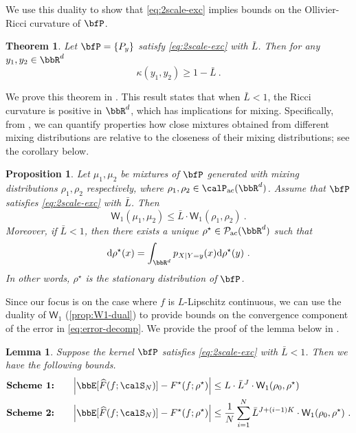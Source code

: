 \documentclass[11pt]{article}
\newtheorem{theorem}{Theorem}[section]
\newtheorem{lemma}{Lemma}[section]
\newtheorem{proposition}{Proposition}[section]
\newcounter{ct}
\newcommand{\rmd}{\mathrm{d}}
\begin{document}
We use this duality to show that \ref{eq:2scale-exc} implies bounds on the Ollivier-Ricci curvature of \(\bfP\).
\begin{theorem}
\label{thm:ricci-curvature}
Let \(\bfP = \{P_{y}\}\) satisfy \ref{eq:2scale-exc} with \(\bar{L}\).
Then for any \(y_{1}, y_{2} \in \bbR^{d}\)
\begin{equation*}
    \kappa(y_{1}, y_{2}) \geq 1 - \bar{L}~.
\end{equation*}
\end{theorem}
We prove this theorem in .
This result states that when \(\bar{L} < 1\), the Ricci curvature is positive in \(\bbR^{d}\), which has implications for mixing.
Specifically, from \citet[Prop. 20]{ollivier2009ricci}, we can quantify properties how close mixtures obtained from different mixing distributions are relative to the closeness of their mixing distributions; see the corollary below.
\begin{proposition}
\label{prop:w1-contract}
Let \(\mu_{1}, \mu_{2}\) be mixtures of \(\bfP\) generated with mixing distributions \(\rho_{1}, \rho_{2}\) respectively, where \(\rho_{1}, \rho_{2} \in \calP_{\mathrm{ac}}(\bbR^{d})\).
Assume that \(\bfP\) satisfies \ref{eq:2scale-exc} with \(\bar{L}\).
Then
\begin{equation*}
    \mathsf{W}_{1}(\mu_{1}, \mu_{2}) \leq \bar{L} \cdot \mathsf{W}_{1}(\rho_{1}, \rho_{2})~.
\end{equation*}
Moreover, if \(\bar{L} < 1\), then there exists a unique \(\rho^{\star} \in \mathcal{P}_{\mathrm{ac}}(\bbR^{d})\) such that
\begin{equation*}
    \rmd \rho^{\star}(x) = \int_{\bbR^{d}} p_{X | Y = y}(x)\rmd \rho^{\star}(y)~.
\end{equation*}
In other words, \(\rho^{\star}\) is the stationary distribution of \(\bfP\).
\end{proposition}

Since our focus is on the case where \(f\) is \(L\)-Lipschitz continuous, we can use the duality of \(\mathsf{W}_{1}\) (\cref{prop:W1-dual}) to provide bounds on the convergence component of the error in \cref{eq:error-decomp}.
We provide the proof of the lemma below in .

\begin{lemma}
\label{lem:conv-error-bound}
Suppose the kernel \(\bfP\) satisfies \ref{eq:2scale-exc} with \(\bar{L} < 1\).
Then we have the following bounds.
        \begin{align*}
            \textbf{Scheme 1:} & & \quad \left|\bbE[\widehat{F}(f; \calS_{N})] - F^{\star}(f; \rho^{\star})\right| & \leq L \cdot \bar{L}^{J} \cdot \mathsf{W}_{1}(\rho_{0}, \rho^{\star})\\
            \textbf{Scheme 2:} & & \quad \left|\bbE[\widehat{F}(f; \calS_{N})] - F^{\star}(f; \rho^{\star})\right| & \leq \frac{1}{N}\sum_{i=1}^{N} \bar{L}^{J + (i - 1)K} \cdot \mathsf{W}_{1}(\rho_{0}, \rho^{\star})~.
        \end{align*}
\end{lemma}
\end{document}
